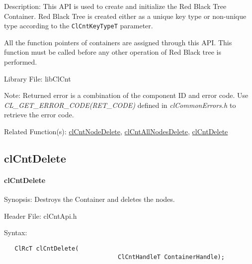 \begin{Desc}
\item[Description:]This API is used to create and initialize the Red Black Tree Container. Red Black Tree is created either as a unique key type or 
non-unique type according to the {\tt{ClCntKeyTypeT}} parameter.
 \par
 All the function pointers of containers are assigned through this API. This function must be called before any other operation of Red Black tree is 
 performed.
\end{Desc}
\begin{Desc}
\item[Library File:]lib\-Cl\-Cnt\end{Desc}
\begin{Desc}
\item[Note:]Returned error is a combination of the component ID and error code. Use \textit{CL\_\-GET\_\-ERROR\_\-CODE(RET\_\-CODE)} defined in 
\textit{clCommonErrors.h} to retrieve the error code.\end{Desc}
\begin{Desc}
\item[Related Function(s):]\hyperlink{pagecnt108}{cl\-Cnt\-Node\-Delete}, \hyperlink{pagecnt106}{cl\-Cnt\-All\-Nodes\-Delete}, 
\hyperlink{pagecnt120}{cl\-Cnt\-Delete} \end{Desc}




\newpage
\subsection{clCntDelete}
\hypertarget{pagecnt120}{}\paragraph{cl\-Cnt\-Delete}\label{pagecnt120}
\begin{Desc}
\item[Synopsis:]Destroys the Container and deletes the nodes.\end{Desc}
\begin{Desc}
\item[Header File:]clCntApi.h\end{Desc}
\begin{Desc}
\item[Syntax:]\end{Desc}


\footnotesize\begin{verbatim}   ClRcT clCntDelete(
                     			ClCntHandleT ContainerHandle);
\end{verbatim}
\normalsize


